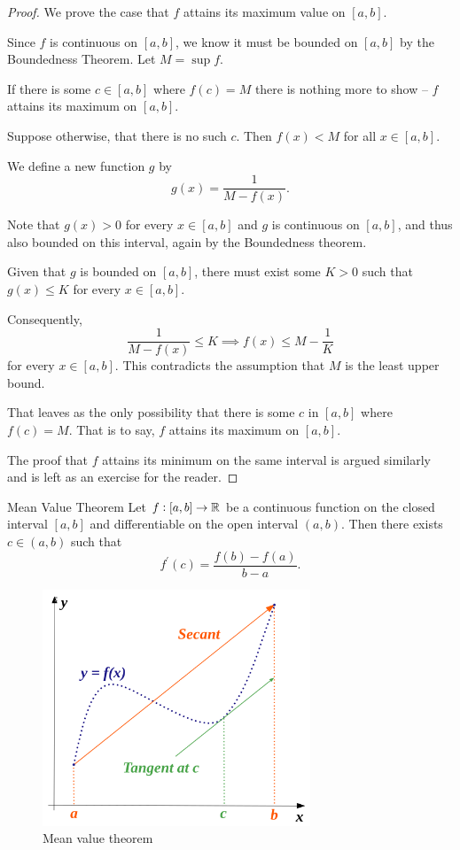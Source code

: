 \begin{proof}
We prove the case that $f$ attains its maximum value on $[a,b]$.

Since $f$ is continuous on $[a,b]$, we know it must be bounded on $[a,b]$ by the Boundedness Theorem. Let $M = \sup f$.

If there is some $c \in [a,b]$ where $f(c)=M$ there is nothing more to show -- $f$ attains its maximum on $[a,b]$.

Suppose otherwise, that there is no such $c$. Then $f(x)<M$ for all $x \in [a,b]$.

We define a new function $g$ by 
\[ g(x) = \frac{1}{M-f(x)}. \]

Note that $g(x)>0$ for every $x \in [a,b]$ and $g$ is continuous on $[a,b]$, and thus also bounded on this interval, again by the Boundedness theorem.

Given that $g$ is bounded on $[a,b]$, there must exist some $K>0$ such that $g(x) \le K$ for every $x \in [a,b]$.

Consequently,
\[ \frac{1}{M-f(x)} \le K \implies f(x) \le M - \frac{1}{K} \]
for every $x \in [a,b]$. This contradicts the assumption that $M$ is the least upper bound.

That leaves as the only possibility that there is some $c$ in $[a,b]$ where $f(c)=M$. That is to say, $f$ attains its maximum on $[a,b]$.

The proof that $f$ attains its minimum on the same interval is argued similarly and is left as an exercise for the reader.
\end{proof}

\begin{thrm}{Mean Value Theorem}{}
Let $f:[a,b]\to\mathbb R$ be a continuous function on the closed interval $[a,b]$ and differentiable on the open interval $(a,b)$. Then there exists $c \in (a,b)$ such that 
\[ f^\prime(c)=\frac{f(b)-f(a)}{b-a}. \]
\end{thrm}

\begin{figure}[H]
    \centering
    \includegraphics[width=8cm]{images/mean_value_thrm.png}
    \caption{Mean value theorem}
\end{figure}

